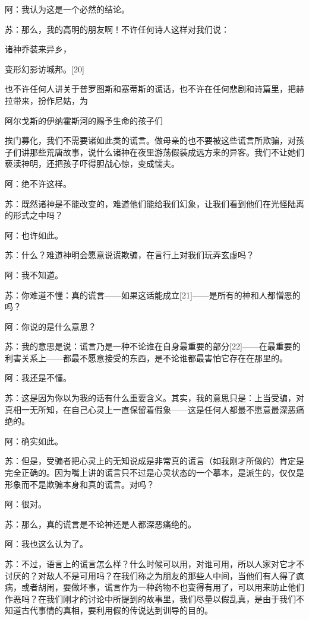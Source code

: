 \documentclass[12pt,oneside]{book}
\begin{document}
阿：我认为这是一个必然的结论。

苏：那么，我的高明的朋友啊！不许任何诗人这样对我们说：





诸神乔装来异乡，

变形幻影访城邦。[20]





也不许任何人讲关于普罗图斯和塞蒂斯的谎话，也不许在任何悲剧和诗篇里，把赫拉带来，扮作尼姑，为





阿尔戈斯的伊纳霍斯河的赐予生命的孩子们





挨门募化，我们不需要诸如此类的谎言。做母亲的也不要被这些谎言所欺骗，对孩子们讲那些荒唐故事，说什么诸神在夜里游荡假装成远方来的异客。我们不让她们亵渎神明，还把孩子吓得胆战心惊，变成懦夫。

阿：绝不许这样。

苏：既然诸神是不能改变的，难道他们能给我们幻象，让我们看到他们在光怪陆离的形式之中吗？

阿：也许如此。

苏：什么？难道神明会愿意说谎欺骗，在言行上对我们玩弄玄虚吗？

阿：我不知道。

苏：你难道不懂：真的谎言——如果这话能成立[21]——是所有的神和人都憎恶的吗？

阿：你说的是什么意思？

苏：我的意思是说：谎言乃是一种不论谁在自身最重要的部分[22]——在最重要的利害关系上——都最不愿意接受的东西，是不论谁都最害怕它存在在那里的。

阿：我还是不懂。

苏：这是因为你以为我的话有什么重要含义。其实，我的意思只是：上当受骗，对真相一无所知，在自己心灵上一直保留着假象——这是任何人都最不愿意最深恶痛绝的。

阿：确实如此。

苏：但是，受骗者把心灵上的无知说成是非常真的谎言（如我刚才所做的）肯定是完全正确的。因为嘴上讲的谎言只不过是心灵状态的一个摹本，是派生的，仅仅是形象而不是欺骗本身和真的谎言。对吗？

阿：很对。

苏：那么，真的谎言是不论神还是人都深恶痛绝的。

阿：我也这么认为了。

苏：不过，语言上的谎言怎么样？什么时候可以用，对谁可用，所以人家对它才不讨厌的？对敌人不是可用吗？在我们称之为朋友的那些人中间，当他们有人得了疯病，或者胡闹，要做坏事，谎言作为一种药物不也变得有用了，可以用来防止他们作恶吗？在我们刚才的讨论中所提到的故事里，我们尽量以假乱真，是由于我们不知道古代事情的真相，要利用假的传说达到训导的目的。
\end{document}
